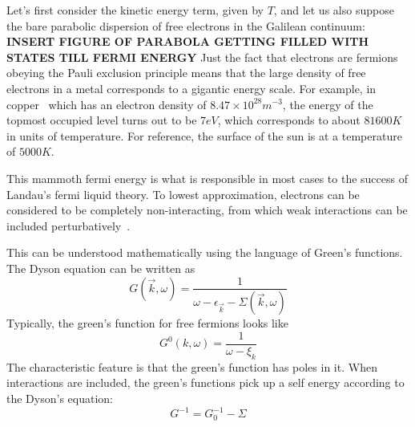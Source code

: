 \par
Let's first consider the kinetic energy term, given by $T$, and let us also suppose the bare parabolic dispersion of free electrons in the Galilean continuum: 
\textbf{INSERT FIGURE OF PARABOLA GETTING FILLED WITH STATES TILL FERMI ENERGY}
Just the fact that electrons are fermions obeying the Pauli exclusion principle means that the large density of free electrons in a metal corresponds to a gigantic energy scale. For example, in copper~\cite{Ashcroft1976} which has an electron density of $8.47\times 10^{28} m^{-3}$, the energy of the topmost occupied level turns out to be $7 eV$, which corresponds to about $81600 K$ in units of temperature. For reference, the surface of the sun is at a temperature of $5000 K$. 
\par 
This mammoth fermi energy is what is responsible in most cases to the success of Landau's fermi liquid theory. To lowest approximation, electrons can be considered to be completely non-interacting, from which weak interactions can be included perturbatively~\cite{luttinger1960ground,baym1961conservation,pines2018microscopic}. 
\par 
This can be understood mathematically using the language of Green's functions. The Dyson equation can be written as 
\begin{equation}
    G(\vec{k},\omega) = \frac{1}{\omega - \epsilon_{\vec{k}} - \Sigma(\vec{k},\omega)}
\end{equation}
 Typically, the green's function for free fermions looks like \begin{equation}
        G^0(k,\omega) = \frac{1}{\omega - \xi_k}
    \end{equation}
 The characteristic feature is that the green's function has poles in it. When interactions are included, the green's functions pick up a self energy according to the Dyson's equation:
 \begin{equation}
         G^{-1} = G_0^{-1} - \Sigma
 \end{equation}

